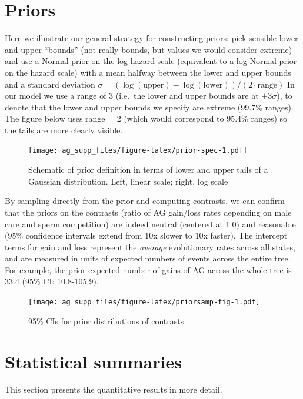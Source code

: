 \documentclass[
]{article}
\begin{document}
\hypertarget{priors}{%
\section{Priors}\label{priors}}

Here we illustrate our general strategy for constructing priors: pick
sensible lower and upper ``bounds'' (not really bounds, but values we
would consider extreme) and use a Normal prior on the log-hazard scale
(equivalent to a log-Normal prior on the hazard scale) with a mean
halfway between the lower and upper bounds and a standard deviation
\(\sigma = (\log(\textrm{upper})-\log(\textrm{lower}))/(2 \cdot \textrm{range})\)
In our model we use a range of 3 (i.e.~the lower and upper bounds are at
\(\pm 3 \sigma\)), to denote that the lower and upper bounds we specify
are extreme (99.7\% ranges). The figure below uses range = 2 (which
would correspond to 95.4\% ranges) so the tails are more clearly
visible.

\begin{figure}
\centering
\texttt{[image: ag\_supp\_files/figure-latex/prior-spec-1.pdf]}
\caption{Schematic of prior definition in terms of lower and upper tails
of a Gaussian distribution. Left, linear scale; right, log scale}
\end{figure}

By sampling directly from the prior and computing contrasts, we can
confirm that the priors on the contrasts (ratio of AG gain/loss rates
depending on male care and sperm competition) are indeed neutral
(centered at 1.0) and reasonable (95\% confidence intervals extend from
10x slower to 10x faster). The intercept terms for gain and loss
represent the \emph{average} evolutionary rates across all states, and
are measured in units of expected numbers of events across the entire
tree. For example, the prior expected number of gains of AG across the
whole tree is 33.4 (95\% CI: 10.8-105.9).

\begin{figure}
\centering
\texttt{[image: ag\_supp\_files/figure-latex/priorsamp-fig-1.pdf]}
\caption{95\% CIs for prior distributions of contrasts}
\end{figure}

\hypertarget{statistical-summaries}{%
\section{Statistical summaries}\label{statistical-summaries}}

This section presents the quantitative results in more detail.
\end{document}

